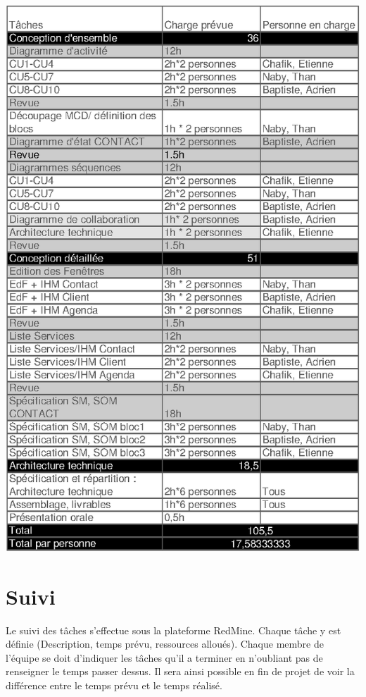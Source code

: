     \begin{center}\includegraphics[height=0.6\textheight]{h4212SuiviTache.png} \end{center}

\vspace{10 mm}

\section{Suivi}

Le suivi des tâches s'effectue sous la plateforme RedMine. Chaque tâche y est définie (Description, temps prévu, ressources alloués). Chaque membre de l'équipe se doit d'indiquer les tâches qu'il a terminer en n'oubliant pas de 
renseigner le temps passer dessus. Il sera ainsi possible en fin de projet de voir la différence entre le temps prévu et le temps réalisé.

